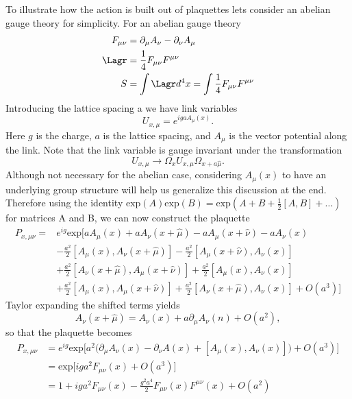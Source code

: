 To illustrate how the action is built out of plaquettes lets consider an abelian gauge theory for simplicity.
For an abelian gauge theory
\begin{align}
  F_{\mu\nu} &= \partial_\mu A_\nu-\partial_\nu A_\mu \\
  \Lagr &= \frac{1}{4}F_{\mu\nu}F^{\mu\nu} \\
  S &= \int \Lagr d^4x = \int  \frac{1}{4}F_{\mu\nu}F^{\mu\nu}
\end{align}
Introducing the lattice spacing a we have link variables
\begin{equation}
  U_{x,\mu}= e^{igaA_\mu(x)}.
\end{equation}
Here $g$ is the charge, $a$ is the lattice spacing, and $A_\mu$ is the vector potential along the link.
Note that the link variable is gauge invariant under the transformation
\begin{equation}
  U_{x,\mu}\rightarrow \Omega_x U_{x,\mu} \Omega_{x+a\hat{\mu}}.
\end{equation}
Although not necessary for the abelian case, considering $A_\mu(x)$ to have an underlying group structure will help us generalize this discussion at the end.
Therefore using the identity $\mbox{exp}(A)\mbox{exp}(B)=\mbox{exp}(A+B+\frac{1}{2}[A,B]+...)$ for matrices A and B, we can now construct the plaquette
\begin{equation}
  \begin{aligned}
    P_{x,\mu\nu}=&e^{ig}\mbox{exp}\Big[aA_\mu(x)+aA_\nu(x+\hat{\mu})-aA_\mu(x+\hat{\nu})-aA_\nu(x) \\
                 &-\frac{a^2}{2}[A_\mu(x),A_\nu(x+\hat{\mu})]-\frac{a^2}{2}[A_\mu(x+\hat{\nu}),A_\nu(x)] \\
                 &+\frac{a^2}{2}[A_\nu(x+\hat{\mu}),A_\mu(x+\hat{\nu})] + \frac{a^2}{2}[A_\mu(x),A_\nu(x)] \\
                 &+\frac{a^2}{2}[A_\mu(x),A_\mu(x+\hat{\nu})]+\frac{a^2}{2}[A_\nu(x+\hat{\mu}),A_\nu(x)]+O(a^3)\Big]
  \end{aligned}
\end{equation}
Taylor expanding the shifted terms yields
\begin{equation}
  A_\nu(x+\hat{\mu})=A_\nu(x)+a\partial_\mu A_\nu(n)+O(a^2),
\end{equation}
so that the plaquette becomes
\begin{equation}
  \begin{aligned}
  P_{x,\mu\nu}&=e^{ig}\mbox{exp}\Big[a^2\big(\partial_\mu A_\nu(x)-\partial_\nu A(x) + [A_\mu(x),A_\nu(x)]\big)+O(a^3)\Big] \\
              &=\mbox{exp}\Big[iga^2F_{\mu\nu}(x)+O(a^3)\Big]  \\
              &=1+iga^2F_{\mu\nu}(x)-\frac{g^2a^4}{2}F_{\mu\nu}(x)F^{\mu\nu}(x) + O(a^2)
  \end{aligned}
\end{equation}
